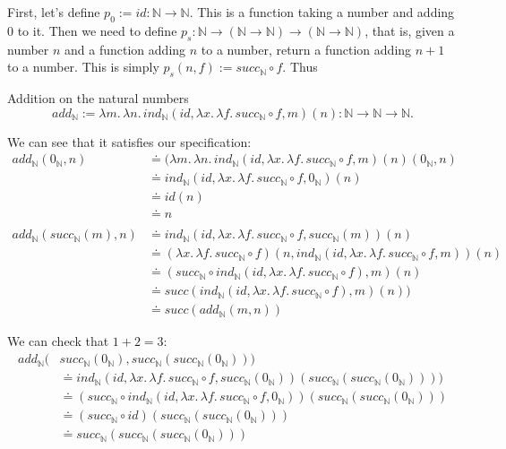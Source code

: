 \documentclass[a4paper, 12pt]{article}
\newcommand{\N}{\mathbb{N}}
\newcommand{\la}[1]{\lambda{#1}.\,}
\theoremstyle{changedot}
\theoremstyle{changedotbreak}
\theoremstyle{nonumberplain}
\begin{document}
First, let's define $p_{0} := id : \N \to \N$. This is a function taking a number and adding 0 to it. Then we need to define $p_{s} : \N \to (\N \to \N) \to (\N \to \N)$, that is, given a number $n$ and a function adding $n$ to a number, return a function adding $n+1$ to a number. This is simply $p_{s}(n, f) := succ_{\N} \circ f$. Thus

\begin{definition}
  Addition on the natural numbers
  \[add_{\N} := \la m \la n ind_{\N}(id, \la x \la f succ_{\N} \circ f, m)(n) : \N \to \N \to \N.\]
\end{definition}

We can see that it satisfies our specification:
\begin{align*}
  add_{\N}(0_{\N}, n) &\doteq (\la m \la n ind_{\N}(id, \la x \la f succ_{\N} \circ f, m)(n)(0_{\N}, n) \\
  &\doteq ind_{\N}(id, \la x \la f succ_{\N} \circ f, 0_{\N})(n) \\
                 &\doteq id(n) \\
                 &\doteq n \\ \\
  add_{\N}(succ_{\N}(m), n) &\doteq ind_{\N}(id, \la x \la f succ_{\N} \circ f, succ_{\N}(m))(n) \\
                 &\doteq (\la x \la f succ_{\N} \circ f)(n, ind_{\N}(id, \la x \la f succ_{\N} \circ f, m))(n) \\
                 &\doteq (succ_{\N} \circ ind_{\N}(id, \la x \la f succ_{\N} \circ f), m)(n) \\
                 &\doteq succ(ind_{\N}(id, \la x \la f succ_{\N} \circ f), m)(n)) \\
  &\doteq succ(add_{\N}(m, n))
\end{align*}

We can check that $1+2=3$:
\begin{align*}
  add_{\N}(&succ_{\N}(0_{\N}), succ_{\N}(succ_{\N}(0_{\N}))) \\
           &\doteq ind_{\N}(id, \la x \la f succ_{\N} \circ f, succ_{\N}(0_{\N}))(succ_{\N}(succ_{\N}(0_{\N})))) \\
  &\doteq (succ_{\N}\circ ind_{\N}(id, \la x \la f succ_{\N} \circ f, 0_{\N}))(succ_{\N}(succ_{\N}(0_{\N}))) \\
           &\doteq (succ_{\N} \circ id)(succ_{\N}(succ_{\N}(0_{\N}))) \\
  &\doteq succ_{\N}(succ_{\N}(succ_{\N}(0_{\N})))
\end{align*}
\end{document}
